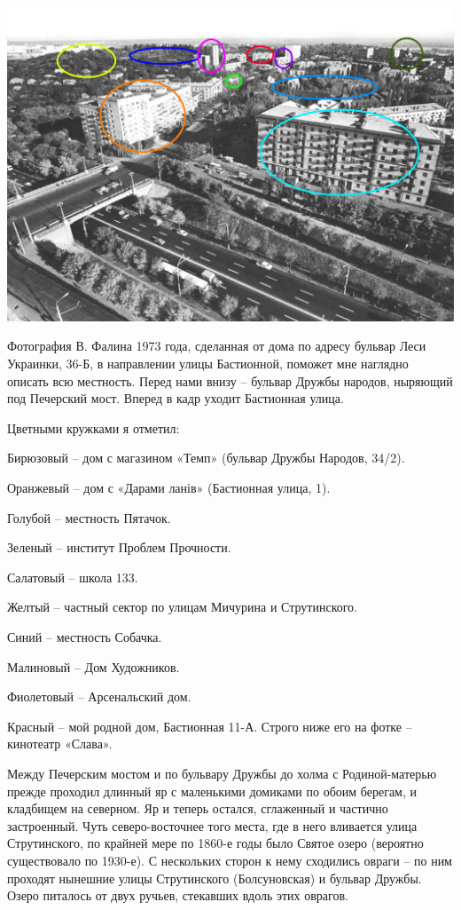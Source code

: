 \begin{center}
\includegraphics[width=\linewidth]{chast-vosp/zver/1973-falin-marks.jpg}
\end{center}

Фотография В. Фалина 1973 года, сделанная от дома по адресу бульвар Леси Украинки, 36-Б, в направлении улицы Бастионной, поможет мне наглядно описать всю местность. Перед нами внизу – бульвар Дружбы народов, ныряющий под Печерский мост. Вперед в кадр уходит Бастионная улица.

Цветными кружками я отметил:

Бирюзовый – дом с магазином «Темп» (бульвар Дружбы Народов, 34/2).

Оранжевый – дом с «Дарами ланів» (Бастионная улица, 1).

Голубой – местность Пятачок.

Зеленый – институт Проблем Прочности.

Салатовый – школа 133.

Желтый – частный сектор по улицам Мичурина и Струтинского.

Синий – местность Собачка.

Малиновый – Дом Художников.

Фиолетовый – Арсенальский дом.

Красный – мой родной дом, Бастионная 11-А. Строго ниже его на фотке – кинотеатр «Слава».

Между Печерским мостом и по бульвару Дружбы до холма с Родиной-матерью прежде проходил длинный яр с маленькими домиками по обоим берегам, и кладбищем на северном. Яр и теперь остался, сглаженный и частично застроенный. Чуть северо-восточнее того места, где в него вливается улица Струтинского, по крайней мере по 1860-е годы было Святое озеро (вероятно существовало по 1930-е). С нескольких сторон к нему сходились овраги – по ним проходят нынешние улицы Струтинского (Болсуновская) и бульвар Дружбы. Озеро питалось от двух ручьев, стекавших вдоль этих оврагов.

